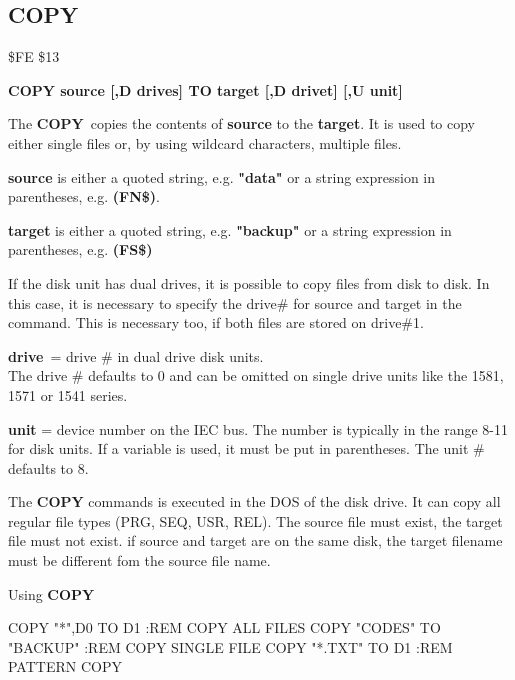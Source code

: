 \subsection{COPY}
\begin{description}[leftmargin=3cm,style=nextline]
\item [Token:] \$FE \$13
\item [Format:] {\bf COPY source [,D drives] TO
                target [,D drivet] [,U unit] }
\item [Usage:]
   The {\bf COPY} copies the contents of
   {\bf source} to the {\bf target}.
   It is used to copy either single files or, by using
   wildcard characters, multiple files.

   {\bf source} is either a quoted string, e.g. {\bf "data"} or
   a string expression in parentheses, e.g. {\bf (FN\$)}.

   {\bf target} is either a quoted string, e.g. {\bf "backup"} or
   a string expression in parentheses, e.g. {\bf (FS\$)}

   If the disk unit has dual drives, it is possible to copy
   files from disk to disk.
   In this case, it is necessary to specify the drive\#
   for source and target in the command. This is necessary too, if both
   files are stored on drive\#1.

   {\bf drive} = drive \# in dual drive disk units. \\
   The drive \# defaults to 0 and can be omitted on single drive units
   like the 1581, 1571 or 1541 series.

   {\bf unit} = device number on the IEC bus.
   The number is typically in the range 8-11 for disk units.
   If a variable is used, it must be put in parentheses.
   The unit \# defaults to 8.

\item [Remarks:]
   The {\bf COPY} commands is executed in the DOS of the disk drive.
   It can copy all regular file types (PRG, SEQ, USR, REL).
   The source file must exist, the target file must not exist.
   if source and target are on the same disk, the target filename
   must be different fom the source file name.

\item [Example:] Using {\bf COPY}
\begin{screenoutput}
  COPY "*",D0 TO D1        :REM COPY ALL FILES
  COPY "CODES" TO "BACKUP" :REM COPY SINGLE FILE
  COPY "*.TXT" TO D1       :REM PATTERN COPY
\end{screenoutput}
\end{description}

